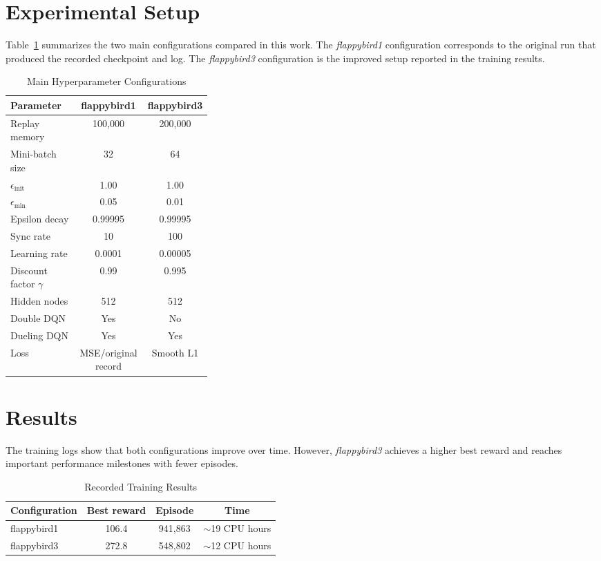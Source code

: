 \documentclass[conference]{IEEEtran}
\begin{document}
\section{Experimental Setup}
Table~\ref{tab:hyperparameters} summarizes the two main configurations compared in this work. The \textit{flappybird1} configuration corresponds to the original run that produced the recorded checkpoint and log. The \textit{flappybird3} configuration is the improved setup reported in the training results.

\begin{table}[htbp]
\caption{Main Hyperparameter Configurations}
\label{tab:hyperparameters}
\centering
\begin{tabular}{p{0.34\linewidth}cc}
\toprule
\textbf{Parameter} & \textbf{flappybird1} & \textbf{flappybird3} \\
\midrule
Replay memory & 100,000 & 200,000 \\
Mini-batch size & 32 & 64 \\
$\epsilon_{\text{init}}$ & 1.00 & 1.00 \\
$\epsilon_{\text{min}}$ & 0.05 & 0.01 \\
Epsilon decay & 0.99995 & 0.99995 \\
Sync rate & 10 & 100 \\
Learning rate & 0.0001 & 0.00005 \\
Discount factor $\gamma$ & 0.99 & 0.995 \\
Hidden nodes & 512 & 512 \\
Double DQN & Yes & No \\
Dueling DQN & Yes & Yes \\
Loss & MSE/original record & Smooth L1 \\
\bottomrule
\end{tabular}
\end{table}

\section{Results}
The training logs show that both configurations improve over time. However, \textit{flappybird3} achieves a higher best reward and reaches important performance milestones with fewer episodes.

\begin{table}[htbp]
\caption{Recorded Training Results}
\label{tab:results}
\centering
\begin{tabular}{lccc}
\toprule
\textbf{Configuration} & \textbf{Best reward} & \textbf{Episode} & \textbf{Time} \\
\midrule
flappybird1 & 106.4 & 941,863 & $\sim$19 CPU hours \\
flappybird3 & 272.8 & 548,802 & $\sim$12 CPU hours \\
\bottomrule
\end{tabular}
\end{table}
\end{document}
